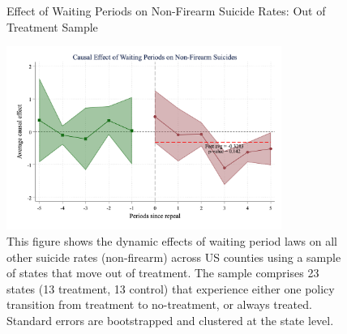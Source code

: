 \pagebreak
\clearpage

\begin{figure}[htbp]
    \centering
    \caption{Effect of Waiting Periods on Non-Firearm Suicide Rates: Out of Treatment Sample}
    \label{fig:firearm_suicide_DID_other-out}
    \includegraphics[width=0.8\textwidth]{figures/1012-csid-all-outsample-other.png}
    \begin{minipage}{\linewidth}
    \caption*{\footnotesize{
    This figure shows the dynamic effects of waiting period laws on all other suicide rates (non-firearm) across US counties using a sample of states that move out of treatment. The sample comprises 23 states (13 treatment, 13 control) that experience either one policy transition from treatment to no-treatment, or always treated. Standard errors are bootstrapped and clustered at the state level. }}
  \end{minipage}
\end{figure}

\pagebreak
\clearpage

